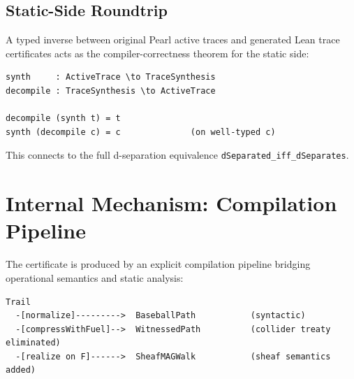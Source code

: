 \documentclass[acmsmall,screen,nonacm]{acmart}
\newcommand{\lean}[1]{\lstinline!#1!}
\begin{document}
\subsection{Static-Side Roundtrip}
A typed inverse between original Pearl active traces and generated Lean trace certificates acts as the compiler-correctness theorem for the static side:
\begin{lstlisting}
synth     : ActiveTrace \to TraceSynthesis
decompile : TraceSynthesis \to ActiveTrace

decompile (synth t) = t
synth (decompile c) = c              (on well-typed c)
\end{lstlisting}
This connects to the full d-separation equivalence \lean{dSeparated_iff_dSeparates}.

\section{Internal Mechanism: Compilation Pipeline}\label{sec:pipeline}
The certificate is produced by an explicit compilation pipeline bridging operational semantics and static analysis:
\begin{lstlisting}
Trail
  -[normalize]--------->  BaseballPath           (syntactic)
  -[compressWithFuel]-->  WitnessedPath          (collider treaty eliminated)
  -[realize on F]------>  SheafMAGWalk           (sheaf semantics added)
\end{lstlisting}
\end{document}
